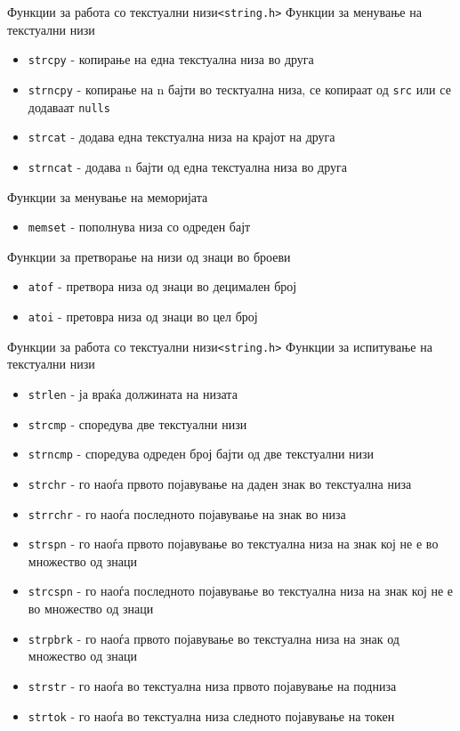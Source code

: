 

\begin{frame}{Функции за работа со текстуални
низи}{\texttt{<string.h>}}
Функции за менување на текстуални низи
\begin{itemize}
  \item \texttt{strcpy} - копирање на една текстуална низа во друга
  \item \texttt{strncpy} - копирање на n бајти во тесктуална низа, се
  копираат од \texttt{src} или се додаваат \texttt{nulls}
  \item \texttt{strcat} - додава една текстуална низа на крајот на друга
  \item \texttt{strncat} - додава n бајти од една текстуална низа во друга
\end{itemize}
Функции за менување на меморијата
\begin{itemize}
  \item \texttt{memset} - пополнува низа со одреден бајт
\end{itemize}
Функции за претворање на низи од знаци во броеви
\begin{itemize}
  \item \texttt{atof} - претвора низа од знаци во децимален број
  \item \texttt{atoi} - претовра низа од знаци во цел број 
\end{itemize}

\end{frame}

\begin{frame}[shrink=10]{Функции за работа со текстуални
низи}{\texttt{<string.h>}}
Функции за испитување на текстуални низи
\begin{itemize}
  \item \texttt{strlen} - ја враќа должината на низата
  \item \texttt{strcmp} - споредува две текстуални низи
  \item \texttt{strncmp} - споредува одреден број бајти од две текстуални низи
  \item \texttt{strchr} - го наоѓа првото појавување на даден знак во текстуална низа
  \item \texttt{strrchr} - го наоѓа последното појавување на знак во низа
  \item \texttt{strspn} - го наоѓа првото појавување во текстуална низа на знак кој
  не е во множество од знаци
  \item \texttt{strcspn} - го наоѓа последното појавување во текстуална низа на знак кој
  не е во множество од знаци
  \item \texttt{strpbrk} - го наоѓа првото појавување во текстуална низа на знак од
  множество од знаци
  \item \texttt{strstr} - го наоѓа во текстуална низа првото појавување на подниза
  \item \texttt{strtok} - го наоѓа во текстуална низа следното појавување на токен
\end{itemize} 
\end{frame}

